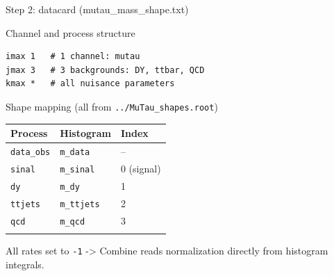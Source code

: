 \begin{frame}[fragile]{Step 2: datacard (mutau\_mass\_shape.txt)}
\protect{}\label{step-2-datacard-mutau_mass_shape.txt}
\begin{block}{Channel and process structure}
\protect{}\label{channel-and-process-structure}
\begin{verbatim}
imax 1   # 1 channel: mutau
jmax 3   # 3 backgrounds: DY, ttbar, QCD
kmax *   # all nuisance parameters
\end{verbatim}
\end{block}

\begin{block}{Shape mapping (all from \texttt{../MuTau\_shapes.root})}
\protect{}\label{shape-mapping-all-from-..mutau_shapes.root}
\begin{longtable}[]{@{}lll@{}}
\toprule\noalign{}
Process & Histogram & Index \\
\midrule\noalign{}
\endhead
\texttt{data\_obs} & \texttt{m\_data} & -- \\
\texttt{sinal} & \texttt{m\_sinal} & 0 (signal) \\
\texttt{dy} & \texttt{m\_dy} & 1 \\
\texttt{ttjets} & \texttt{m\_ttjets} & 2 \\
\texttt{qcd} & \texttt{m\_qcd} & 3 \\
\bottomrule\noalign{}
\end{longtable}

All rates set to \texttt{-1} -\textgreater{} Combine reads normalization
directly from histogram integrals.
\end{block}
\end{frame}

